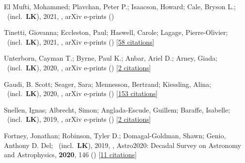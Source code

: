 \item[{\color{numcolor}\scriptsize12}] El Mufti, Mohammed; Plavchan, Peter P.; Isaacson, Howard; Cale, Bryson L.; \etal\ (incl.\ \textbf{LK}), 2021, , arXiv e-prints ()

\item[{\color{numcolor}\scriptsize11}] Tinetti, Giovanna; Eccleston, Paul; Haswell, Carole; Lagage, Pierre-Olivier; \etal\ (incl.\ \textbf{LK}), 2021, , arXiv e-prints () [\href{https://ui.adsabs.harvard.edu/abs/2021arXiv210404824T}{58 citations}]

\item[{\color{numcolor}\scriptsize10}] Unterborn, Cayman T.; Byrne, Paul K.; Anbar, Ariel D.; Arney, Giada; \etal\ (incl.\ \textbf{LK}), 2020, , arXiv e-prints () [\href{https://ui.adsabs.harvard.edu/abs/2020arXiv200708665U}{2 citations}]

\item[{\color{numcolor}\scriptsize9}] Gaudi, B. Scott; Seager, Sara; Mennesson, Bertrand; Kiessling, Alina; \etal\ (incl.\ \textbf{LK}), 2020, , arXiv e-prints () [\href{https://ui.adsabs.harvard.edu/abs/2020arXiv200106683G}{153 citations}]

\item[{\color{numcolor}\scriptsize8}] Snellen, Ignas; Albrecht, Simon; Anglada-Escude, Guillem; Baraffe, Isabelle; \etal\ (incl.\ \textbf{LK}), 2019, , arXiv e-prints () [\href{https://ui.adsabs.harvard.edu/abs/2019arXiv190801803S}{2 citations}]

\item[{\color{numcolor}\scriptsize7}] Fortney, Jonathan; Robinson, Tyler D.; Domagal-Goldman, Shawn; Genio, Anthony D. Del; \etal\ (incl.\ \textbf{LK}), 2019, , Astro2020: Decadal Survey on Astronomy and Astrophysics, \textbf{2020}, 146 () [\href{https://ui.adsabs.harvard.edu/abs/2019astro2020T.146F}{11 citations}]

